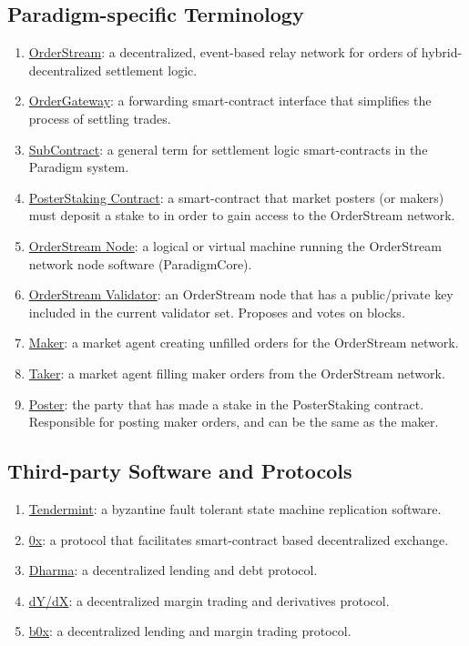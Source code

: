 \documentclass[9pt]{article}
\begin{document}
\subsection{Paradigm-specific Terminology}
\begin{enumerate}
\item \underline{OrderStream}: a decentralized, event-based relay network for orders of hybrid-decentralized settlement logic. 
\item \underline{OrderGateway}: a forwarding smart-contract interface that simplifies the process of settling trades. 
\item \underline{SubContract}: a general term for settlement logic smart-contracts in the Paradigm system.
\item \underline{PosterStaking Contract}: a smart-contract that market posters (or makers) must deposit a stake to in order to gain access to the OrderStream network.
\item \underline{OrderStream Node}: a logical or virtual machine running the OrderStream network node software (ParadigmCore).
\item \underline{OrderStream Validator}: an OrderStream node that has a public/private key included in the current validator set. Proposes and votes on blocks. 
\item \underline{Maker}: a market agent creating unfilled orders for the OrderStream network.
\item \underline{Taker}: a market agent filling maker orders from the OrderStream network.
\item \underline{Poster}: the party that has made a stake in the PosterStaking contract. Responsible for posting maker orders, and can be the same as the maker.
\end{enumerate}

\subsection{Third-party Software and Protocols}
\begin{enumerate}
\item \underline{Tendermint}: a byzantine fault tolerant state machine replication software.
\item \underline{0x}: a protocol that facilitates smart-contract based decentralized exchange.
\item \underline{Dharma}: a decentralized lending and debt protocol.
\item \underline{dY/dX}: a decentralized margin trading and derivatives protocol.
\item \underline{b0x}: a decentralized lending and margin trading protocol.
\end{enumerate}
\end{document}
